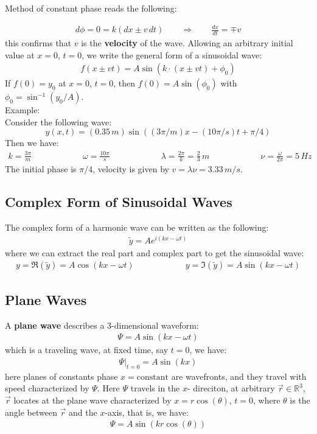 \documentclass[11pt]{book}
\theoremstyle{break}
\theoremstyle{break}
\newcommand{\R}{\mathbb{R}}
\newcommand{\that}[1]{\widetilde{#1}}
\newcommand{\example}{\color{green}Example: \color{black}}
\begin{document}
Method of constant phase reads the following:

\begin{align*}
d\phi = 0 = k(dx \pm v\, dt) \qquad \Rightarrow \qquad \frac{dx}{dt} = \mp v
\end{align*}
this confirms that $v$ is the \textbf{velocity} of the wave. Allowing an arbitrary initial value at $x= 0$, $t= 0$, we write the general form of a sinusoidal wave:
\begin{align*}
f(x\pm vt) = A \sin(k\cdot (x\pm vt) + \phi_0)
\end{align*}
If $f(0) = y_0$ at $x=0$, $t=0$, then $f(0) = A \sin(\phi_0)$ with $\phi_0 = \sin^{-1}(y_0/A)$. \\

\example\\
Consider the following wave: 
$$y(x,t) = (0.35\, m) \sin\left( (3\pi /m)x - (10\pi/s)t + \pi/4\right)$$ 
Then we have:
\begin{align*}
k = \frac{3\pi}{m} \qquad \qquad \qquad \omega = \frac{10\pi}{s} \qquad\qquad\qquad \lambda = \frac{2\pi}{k} = \frac{2}{3}\, m \qquad\qquad\qquad \nu = \frac{\omega}{2\pi} = 5\, Hz
\end{align*} 
The initial phase is $\pi/4$, velocity is given by $v = \lambda \nu = 3.33\, m/s$.\\

\subsection{Complex Form of Sinusoidal Waves}
The complex form of a harmonic wave can be written as the following:
\begin{align*}
\widetilde{y} = Ae^{i(kx - \omega t)}
\end{align*}
where we can extract the real part and complex part to get the sinusoidal wave:
\begin{align*}
y = \Re(\that{y}) = A \cos(kx - \omega t) \qquad\qquad\qquad y = \Im(\that{y}) = A \sin(kx - \omega t)
\end{align*}

\newpage
\subsection{Plane Waves}
A \textbf{plane wave} describes a $3$-dimensional waveform:
\begin{align*}
\Psi = A\sin(kx - \omega t)
\end{align*}  
which is a traveling wave, at fixed time, say $t=0$, we have:
\begin{align*}
\Psi|_{t=0} = A \sin(kx)
\end{align*}
here planes of constants phase $x = \text{constant}$ are wavefronts, and they travel with speed characterized by $\Psi$. Here $\Psi$ travels in the $x$- direciton, at arbitrary $\vec{r}\in \R^3$, $\vec{r}$ locates at the plane wave characterized by $x = r\cos(\theta)$, $t=0$, where $\theta$ is the angle between $\vec{r}$ and the $x$-axis, that is, we have:
\begin{align*}
\Psi = A\sin(kr\cos(\theta))
\end{align*}
\end{document}
